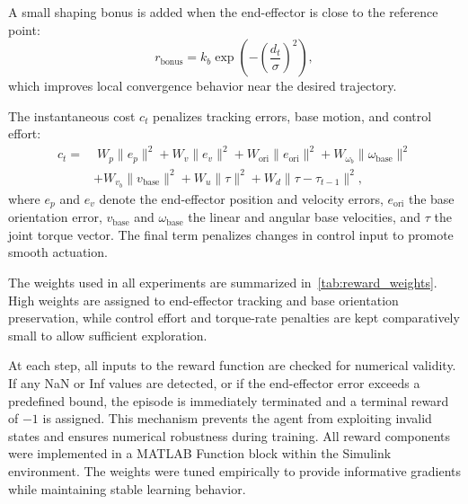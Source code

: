 \documentclass{ieeeaccess}
\begin{document}
A small shaping bonus is added when the end-effector is close to the reference point:
\begin{equation}
r_{\text{bonus}} = k_b \exp\!\left(-\left(\frac{d_t}{\sigma}\right)^2\right),
\end{equation}
which improves local convergence behavior near the desired trajectory.

The instantaneous cost $c_t$ penalizes tracking errors, base motion, and control effort:
\begin{align}
c_t =&\;
W_p \|e_p\|^2
+ W_v \|e_v\|^2
+ W_{\text{ori}} \|e_{\text{ori}}\|^2
+ W_{\omega_b} \|\omega_{\text{base}}\|^2 \nonumber \\
&+ W_{v_b} \|v_{\text{base}}\|^2
+ W_u \|\tau\|^2
+ W_d \|\tau - \tau_{t-1}\|^2 ,
\end{align}
where $e_p$ and $e_v$ denote the end-effector position and velocity errors, $e_{\text{ori}}$ the base orientation error, $v_{\text{base}}$ and $\omega_{\text{base}}$ the linear 
and angular base velocities, and $\tau$ the joint torque vector. The final term penalizes changes in control input to promote smooth actuation.

The weights used in all experiments are summarized in~\autoref{tab:reward_weights}. High weights are assigned to end-effector tracking and base orientation preservation, 
while control effort and torque-rate penalties are kept comparatively small to allow sufficient exploration.

At each step, all inputs to the reward function are checked for numerical validity. If any NaN or Inf values are detected, or if the end-effector error exceeds a predefined bound, 
the episode is immediately terminated and a terminal reward of $-1$ is assigned. This mechanism prevents the agent from exploiting invalid states and ensures numerical robustness during training. All reward components were implemented in a MATLAB Function block within the Simulink environment. The weights were tuned empirically to provide informative gradients while maintaining stable learning behavior.
\end{document}
